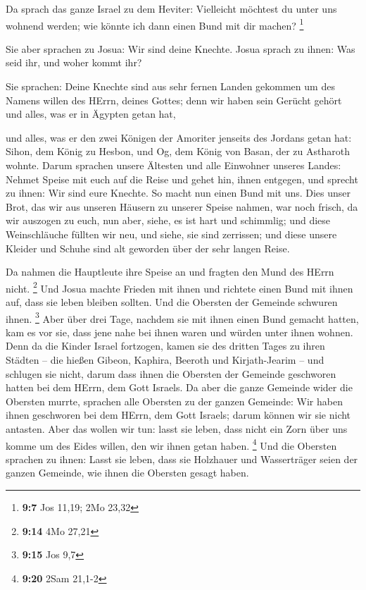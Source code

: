  Da sprach das ganze Israel zu dem Heviter: Vielleicht
möchtest du unter uns wohnend werden; wie könnte ich dann einen Bund mit
dir machen? \footnote{\textbf{9:7} Jos 11,19; 2Mo 23,32}

 Sie aber sprachen zu Josua: Wir sind deine Knechte. Josua
sprach zu ihnen: Was seid ihr, und woher kommt ihr?

 Sie sprachen: Deine Knechte sind aus sehr fernen Landen
gekommen um des Namens willen des HErrn, deines Gottes; denn wir haben
sein Gerücht gehört und alles, was er in Ägypten getan hat,

 und alles, was er den zwei Königen der Amoriter jenseits
des Jordans getan hat: Sihon, dem König zu Hesbon, und Og, dem König von
Basan, der zu Astharoth wohnte.  Darum sprachen unsere
Ältesten und alle Einwohner unseres Landes: Nehmet Speise mit euch auf
die Reise und gehet hin, ihnen entgegen, und sprecht zu ihnen: Wir sind
eure Knechte. So macht nun einen Bund mit uns.  Dies unser
Brot, das wir aus unseren Häusern zu unserer Speise nahmen, war noch
frisch, da wir auszogen zu euch, nun aber, siehe, es ist hart und
schimmlig;  und diese Weinschläuche füllten wir neu, und
siehe, sie sind zerrissen; und diese unsere Kleider und Schuhe sind alt
geworden über der sehr langen Reise.

 Da nahmen die Hauptleute ihre Speise an und fragten den
Mund des HErrn nicht. \footnote{\textbf{9:14} 4Mo 27,21} 
Und Josua machte Frieden mit ihnen und richtete einen Bund mit ihnen
auf, dass sie leben bleiben sollten. Und die Obersten der Gemeinde
schwuren ihnen. \footnote{\textbf{9:15} Jos 9,7}  Aber über
drei Tage, nachdem sie mit ihnen einen Bund gemacht hatten, kam es vor
sie, dass jene nahe bei ihnen waren und würden unter ihnen wohnen.
 Denn da die Kinder Israel fortzogen, kamen sie des dritten
Tages zu ihren Städten -- die hießen Gibeon, Kaphira, Beeroth und
Kirjath-Jearim --  und schlugen sie nicht, darum dass ihnen
die Obersten der Gemeinde geschworen hatten bei dem HErrn, dem Gott
Israels. Da aber die ganze Gemeinde wider die Obersten murrte,
 sprachen alle Obersten zu der ganzen Gemeinde: Wir haben
ihnen geschworen bei dem HErrn, dem Gott Israels; darum können wir sie
nicht antasten.  Aber das wollen wir tun: lasst sie leben,
dass nicht ein Zorn über uns komme um des Eides willen, den wir ihnen
getan haben. \footnote{\textbf{9:20} 2Sam 21,1-2}  Und die
Obersten sprachen zu ihnen: Lasst sie leben, dass sie Holzhauer und
Wasserträger seien der ganzen Gemeinde, wie ihnen die Obersten gesagt
haben.

